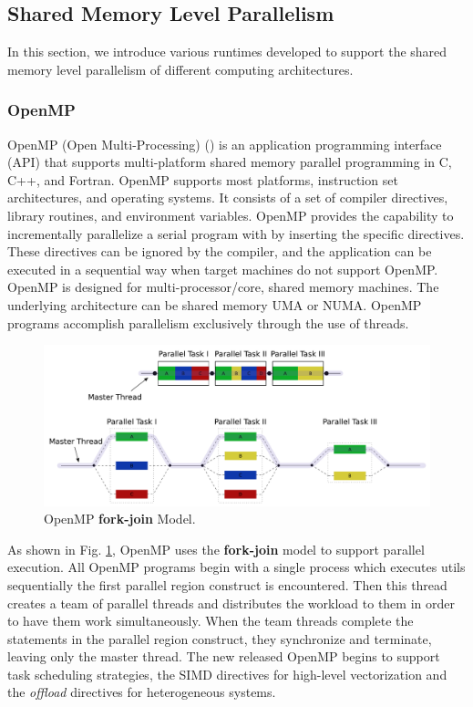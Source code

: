 \subsection{Shared Memory Level Parallelism}

In this section, we introduce various runtimes developed to support the shared memory level parallelism of different computing architectures. 

\subsubsection{OpenMP}

OpenMP (Open Multi-Processing) (\cite{dagum1998openmp}) is an application programming interface (API) that supports multi-platform shared memory parallel programming in C, C++, and Fortran. OpenMP supports most platforms, instruction set architectures, and operating systems. It consists of a set of compiler directives, library routines, and environment variables. OpenMP provides the capability to incrementally parallelize a serial program with by inserting the specific directives. These directives can be ignored by the compiler, and the application can be executed in a sequential way when target machines do not support OpenMP. OpenMP is designed for multi-processor/core, shared memory machines. The underlying architecture can be shared memory UMA or NUMA. OpenMP programs accomplish parallelism exclusively through the use of threads.

\begin{figure}[htbp]
	\centering
	\includegraphics[width=6.3in]{fig/Fork_join.pdf}
	\caption{OpenMP \textbf{fork-join} Model.}
	\label{openmp_fork_join}
\end{figure}

As shown in Fig. \ref{openmp_fork_join}, OpenMP uses the \textbf{fork-join} model to support parallel execution. All OpenMP programs begin with a single process which executes utils sequentially the first parallel region construct is encountered.  Then this thread creates a team of parallel threads and distributes the workload to them in order to have them work simultaneously. When the team threads complete the statements in the parallel region construct, they synchronize and terminate, leaving only the master thread. The new released OpenMP begins to support task scheduling strategies, the SIMD directives for high-level vectorization and the \textit{offload} directives for heterogeneous systems.

